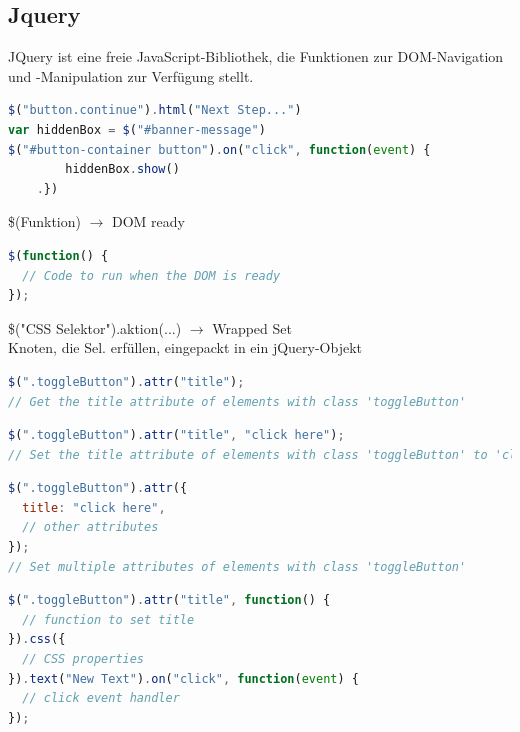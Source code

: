 \subsection{Jquery}
JQuery ist eine freie JavaScript-Bibliothek, die Funktionen zur DOM-Navigation und -Manipulation zur Verfügung stellt.

\begin{lstlisting}[language=JavaScript, style=basesmol]
$("button.continue").html("Next Step...")
var hiddenBox = $("#banner-message")
$("#button-container button").on("click", function(event) {
        hiddenBox.show()
    .})
\end{lstlisting}

\begin{definition}{\$(Funktion)} $\rightarrow$ DOM ready\\
\begin{lstlisting}[language=JavaScript, style=basesmol]
$(function() { 
  // Code to run when the DOM is ready
});
\end{lstlisting}
\end{definition}

\begin{definition}{\$("CSS Selektor").aktion(...)} $\rightarrow$ Wrapped Set\\
  Knoten, die Sel. erfüllen, eingepackt in ein jQuery-Objekt
\begin{lstlisting}[language=JavaScript, style=basesmol]
$(".toggleButton").attr("title");
// Get the title attribute of elements with class 'toggleButton'
\end{lstlisting}
\begin{lstlisting}[language=JavaScript, style=basesmol]
$(".toggleButton").attr("title", "click here");
// Set the title attribute of elements with class 'toggleButton' to 'click here'
\end{lstlisting}
\begin{lstlisting}[language=JavaScript, style=basesmol]
$(".toggleButton").attr({
  title: "click here",
  // other attributes
});
// Set multiple attributes of elements with class 'toggleButton'
\end{lstlisting}
\begin{lstlisting}[language=JavaScript, style=basesmol]
$(".toggleButton").attr("title", function() {
  // function to set title
}).css({
  // CSS properties
}).text("New Text").on("click", function(event) {
  // click event handler
});
\end{lstlisting}
\end{definition}


